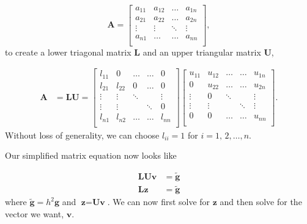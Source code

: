 \documentclass{emulateapj}
\begin{document}
\begin{equation*}
    \mathbf{A} = \begin{bmatrix}
       a_{11} & a_{12} & \ldots & a_{1n} \\
       a_{21} & a_{22} & \ldots & a_{2n} \\
       \vdots & \vdots & \ddots & \vdots \\
       a_{n1} & \ldots & \ldots & a_{nn} \\
    \end{bmatrix},
\end{equation*}
to create a lower triagonal matrix \(\textbf{L}\) and an upper triangular matrix \(\textbf{U}\),

\begin{align*}
    \textbf{A} &= \textbf{L}\textbf{U} =
    \begin{bmatrix}
       l_{11} & 0      & \ldots & \ldots & 0      \\
       l_{21} & l_{22} & 0      & \ldots & 0      \\
       \vdots & \vdots & \ddots &        & \vdots \\
       \vdots & \vdots &        & \ddots & 0      \\
       l_{n1} & l_{n2} & \ldots & \ldots & l_{nn} \\
    \end{bmatrix}
    \begin{bmatrix}
       u_{11} & u_{12} & \ldots & \ldots & u_{1n} \\
       0      & u_{22} & \ldots & \ldots & u_{2n} \\
       \vdots & 0      & \ddots &        & \vdots \\
       \vdots & \vdots &        & \ddots & \vdots \\
       0      & 0      & \ldots & \ldots & u_{nn} \\
    \end{bmatrix}.
\end{align*}
Without loss of generality, we can choose \(l_{ii}=1\) for \(i=1,\,2,\ldots,n\). 

Our simplified matrix equation now looks like

\begin{align*}
    \textbf{L}\textbf{U}\textbf{v} &= \widetilde{\textbf{g}} \\
    \textbf{L}\textbf{z} &= \widetilde{\textbf{g}}
\end{align*}
where \(\widetilde{\textbf{g}} = h^{2}\textbf{g}\) and \(\textbf{z} = \textbf{U}\textbf{v}\). We can now first solve for \(\textbf{z}\) and then solve for the vector we want, \(\textbf{v}\).
\end{document}

